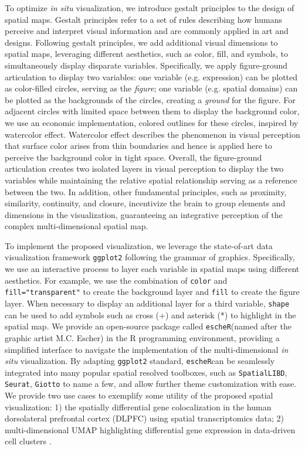 \documentclass[11pt]{article}
\newcommand{\coloc}{\texttt{escheR}}
\begin{document}
 To optimize \textit{in situ} visualization, we introduce gestalt principles to the design of spatial maps. Gestalt principles\cite{todorovic_2008, palmer_1999} refer to a set of rules describing how humans perceive and interpret visual information and are commonly applied in art and designs. Following gestalt principles, we add additional visual dimensions to spatial maps, leveraging different aesthetics, such as color, fill, and symbols, to simultaneously display disparate variables. Specifically, we apply figure-ground articulation to display two variables: one variable (e.g. expression) can be plotted as color-filled circles, serving as the \textit{figure}; one variable (e.g. spatial domains) can be plotted as the backgrounds of the circles, creating a \textit{ground} for the figure. For adjacent circles with limited space between them to display the background color, we use an economic implementation, colored outlines for these circles, inspired by watercolor effect\cite{pinna_1987, pinna_2001}. Watercolor effect describes the phenomenon in visual perception that surface color arises from thin boundaries and hence is applied here to perceive the background color in tight space. Overall, the figure-ground articulation creates two isolated layers in visual perception to display the two variables while maintaining the relative spatial relationship serving as a reference between the two. In addition, other fundamental principles\cite{todorovic_2008}, such as proximity, similarity, continuity, and closure, incentivize the brain to group elements and dimensions in the visualization, guaranteeing an integrative perception of the complex multi-dimensional spatial map.
 

To implement the proposed visualization, we leverage the state-of-art data visualization framework \texttt{ggplot2}\cite{ggplot2} following the grammar of graphics\cite{wilkinson_2012}. Specifically, we use an interactive process to layer each variable in spatial maps using different aesthetics. For example, we use the combination of \texttt{color} and \texttt{fill="transparent"} to create the background layer and \texttt{fill} to create the figure layer. When necessary to display an additional layer for a third variable, \texttt{shape} can be used to add symbols such as cross (+) and asterisk (*) to highlight in the spatial map. We provide an open-source package called \coloc (named after the graphic artist M.C. Escher) in the R programming environment\cite{R}, providing a simplified interface to navigate the implementation of the multi-dimensional \textit{in situ} visualization. By adapting \texttt{ggplot2} standard, \coloc can be seamlessly integrated into many popular spatial resolved toolboxes, such as \texttt{SpatialLIBD}\cite{pardo_2022}, \texttt{Seurat}\cite{hao_2021}, \texttt{Giotto}\cite{dries_2021} to name a few, and allow further theme customization with ease. We provide two use cases to exemplify some utility of the proposed spatial visualization: 1) the spatially differential gene colocalization in the human dorsolateral prefrontal cortex (DLPFC) using spatial transcriptomics data\cite{huukimyers_2023}; 2) multi-dimensional UMAP highlighting differential gene expression in data-driven cell clusters \cite{freytag_2020}. 
\end{document}
